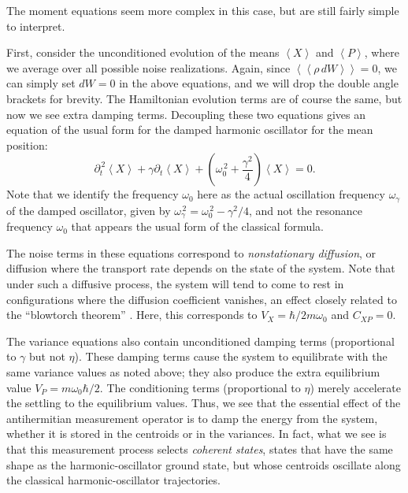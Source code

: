 \documentclass[aps,twocolumn,superscriptaddress,footinbib,floatfix,showpacs]{revtex4}
\newcommand{\dlangle}{\left\langle\!\left\langle}
\newcommand{\drangle}{\right\rangle\!\right\rangle}
\def\dexpct#1{\dlangle{#1}\drangle}
\def\expct#1{\!\left\langle{#1}\right\rangle}
\def\Vx{V_X}
\def\Vp{V_P}
\def\Cxp{C_{XP}}
\begin{document}
The moment equations seem more complex in this case, but are still
fairly simple to interpret.



First, consider the unconditioned evolution of the 
means $\expct{X}$ and $\expct{P}$, where we average over all possible
noise realizations.  
Again, since $\dexpct{\rho\, dW}=0$, we can simply set $dW=0$ in the above
equations, and we will drop the double angle brackets for brevity.
The Hamiltonian evolution terms
are of course the same, but now we see extra damping terms.
Decoupling these two equations %
gives an equation of the usual form for the damped harmonic oscillator for the 
mean position:
\begin{equation}
  \partial_t^{\,2}{\expct{X}} + \gamma\partial_t{\expct{X}} 
   + \left(\omega_0^{\,2}+\frac{\gamma^2}{4}\right)\expct{X} = 0.
\end{equation}
Note that we identify the frequency $\omega_0$ 
here as the actual oscillation frequency $\omega_\gamma$ of the damped oscillator,
given by $\omega_\gamma^{\,2} = \omega_0^{\,2} - \gamma^2/4$, and
not the resonance frequency $\omega_0$ that appears the usual form of the
classical formula.

The noise terms in these equations correspond to \textit{nonstationary
diffusion}, or diffusion where the transport rate depends on the
state of the system.  Note that under such a diffusive process,
the system will tend to come to rest in configurations where 
the diffusion coefficient vanishes, an effect closely related to
the ``blowtorch theorem'' \cite{Landauer93}. 
Here, this corresponds to $\Vx=\hbar/2m\omega_0$ and $\Cxp=0$.

The variance equations also contain unconditioned damping
terms (proportional to $\gamma$ but not $\eta$).
These damping terms cause the system to equilibrate with the same
variance values as noted above; they also produce the extra
equilibrium value
$\Vp=m\omega_0 \hbar/2$.
The conditioning terms (proportional to $\eta$) merely accelerate the
settling to the equilibrium values.
Thus, we see that the essential effect of the antihermitian 
measurement operator is to damp the energy from the system,
whether it is stored in the centroids or in the variances.
In fact, what we see is that this measurement process
selects \textit{coherent states}, states that have the same
shape as the harmonic-oscillator ground state, but whose centroids
oscillate along the classical harmonic-oscillator trajectories.
\end{document}
